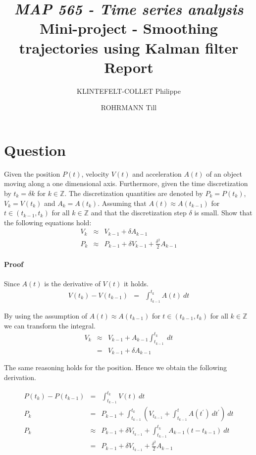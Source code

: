 \documentclass[a4paper, 12pt, titlepage]{article}
\title
{{\em MAP 565 - Time series analysis}\\
Mini-project - Smoothing trajectories using Kalman filter\\
{\bf Report}}
\author{KLINTEFELT-COLLET Philippe \and ROHRMANN Till}
\date{}
\begin{document}
\maketitle

\section{Question}

Given the position $P(t)$, velocity $V(t)$ and acceleration $A(t)$ of an object moving along a one dimensional axis. 
Furthermore, given the time discretization by $t_k=\delta k$ for $k\in \mathbb{Z}$.
The discretization quantities are denoted by $P_k=P(t_k)$, $V_k=V(t_k)$ and $A_k=A(t_k)$.
Assuming that $A(t)\approx A(t_{k-1})$ for $t\in (t_{k-1},t_k)$ for all $k\in\mathbb{Z}$ and that the discretization step $\delta$ is small.
Show that the following equations hold:
\begin{eqnarray}
	V_k &\approx& V_{k-1} + \delta A_{k-1}\\
	P_k &\approx& P_{k-1} + \delta V_{k-1} + \frac{\delta^2}{2} A_{k-1}
\end{eqnarray}

\paragraph{Proof}

Since $A(t)$ is the derivative of $V(t)$ it holds.
\begin{eqnarray}
	V(t_k) - V(t_{k-1}) &=& \int_{t_{k-1}}^{t_k} A(t)\ dt
\end{eqnarray}

By using the assumption of $A(t)\approx A(t_{k-1})$ for $t\in (t_{k-1},t_k)$ for all $k\in\mathbb{Z}$ we can transform the integral.
\begin{eqnarray}
	V_k &\approx& V_{k-1} + A_{k-1} \int_{t_{k-1}}^{t_k}\ dt \\
	&=& V_{k-1}+\delta A_{k-1}
\end{eqnarray}

The same reasoning holds for the position. 
Hence we obtain the following derivation.

\begin{eqnarray}
	P(t_k) - P(t_{k-1}) &=& \int_{t_{k-1}}^{t_k} V(t)\ dt\\
	P_k &=& P_{k-1} + \int_{t_{k-1}}^{t_k}\left( V_{t_{k-1}} + \int_{t_{k-1}}^{t} A(t^{\prime})\ dt^{\prime}\right)\ dt\\
	P_k &\approx& P_{k-1} + \delta V_{t_{k-1}} + \int_{t_{k-1}}^{t_k} A_{k-1}(t-t_{k-1})\ dt\\
	&=& P_{k-1} + \delta V_{t_{k-1}} + \frac{\delta^2}{2} A_{k-1}	
\end{eqnarray}
\end{document}
